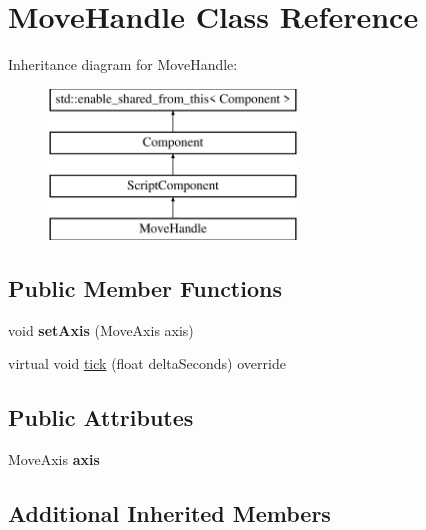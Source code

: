 \hypertarget{class_move_handle}{}\section{Move\+Handle Class Reference}
\label{class_move_handle}
Inheritance diagram for Move\+Handle\+:\begin{figure}[H]
\begin{center}
\leavevmode
\includegraphics[height=4.000000cm]{class_move_handle}
\end{center}
\end{figure}
\subsection*{Public Member Functions}
\begin{DoxyCompactItemize}
\item 
\hypertarget{class_move_handle_a20df8bf30dd3b8e0fd0173b6de610a9f}{}void {\bfseries set\+Axis} (Move\+Axis axis)\label{class_move_handle_a20df8bf30dd3b8e0fd0173b6de610a9f}

\item 
virtual void \hyperlink{class_move_handle_a39cb33cbbf841fee4d07c8a8cc380128}{tick} (float delta\+Seconds) override
\end{DoxyCompactItemize}
\subsection*{Public Attributes}
\begin{DoxyCompactItemize}
\item 
\hypertarget{class_move_handle_a229b7cb6c45728c807f98794f5f32936}{}Move\+Axis {\bfseries axis}\label{class_move_handle_a229b7cb6c45728c807f98794f5f32936}

\end{DoxyCompactItemize}
\subsection*{Additional Inherited Members}


